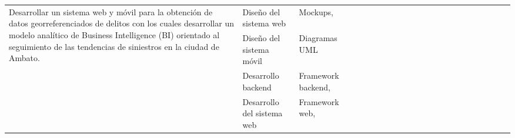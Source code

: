 \begin{landscape}
\begin{ThreePartTable}
\begin{longtable}{|p{}|p{5.5cm}|p{4cm}|l|l|l|l|l|l|l|l|l|l|l|l|l|l|l|l|l|l|l|}
            \hline
            \multirow{4}{0.41\textwidth}{Desarrollar  un sistema web y móvil para la obtención de datos
                georreferenciados de delitos con los cuales desarrollar un modelo analítico de
                Business Intelligence (BI) orientado al seguimiento de las tendencias de siniestros
            en la ciudad de Ambato.}                                            & Diseño del sistema web                                              & Mockups,                                                       &                                       & \                                     & \cellcolor{green!25}                 & \cellcolor{green!25}                  &                      &                      &                      &                      &                      &                      &                      &                      &                      &                      &                      \\
            \cline{2-2}\cline{4-21}
                                                                                & Diseño del sistema móvil                                            & Diagramas UML                                                  &                                       &                                       & \cellcolor{green!25}                 & \cellcolor{green!25}                  &                      &                      &                      &                      &                      &                      &                      &                      &                      &                      &                      \\
            \cline{2-2}\cline{4-21}
                                                                                & Desarrollo backend                                                  & Framework backend,                                             &                                       &                                       &                                      &                                       & \cellcolor{green!25} & \cellcolor{green!25} & \cellcolor{green!25} & \cellcolor{green!25} & \cellcolor{green!25} & \cellcolor{green!25} & \cellcolor{green!25} &                      &                      &                      &                      \\
            \cline{2-2}\cline{4-21}
                                                                                & Desarrollo del sistema web                                          & Framework web,                                                 &                                       &                                       &                                      &                                       & \cellcolor{green!25} & \cellcolor{green!25} & \cellcolor{green!25} & \cellcolor{green!25} &                      &                      &                      &                      &                      &                      &                      \\

\end{longtable}
\end{ThreePartTable}
\end{landscape}
